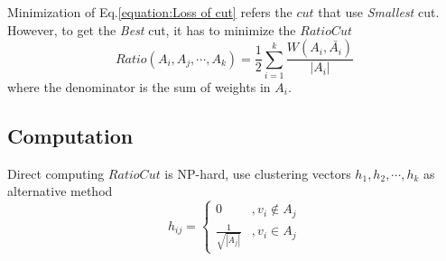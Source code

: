 \documentclass[a4paper]{article}
\begin{document}
Minimization of Eq.\ref{equation:Loss of cut} refers the $cut$ that use \emph{Smallest} cut.
However, to get the \emph{Best} cut, it has to minimize the $RatioCut$
\begin{equation}
    \label{equation:Loss of ratio cut}
    Ratio(A_i, A_j, \cdots, A_k) = \frac{1}{2} \sum_{i=1}^{k} \frac{W(A_i, \bar{A_i})}{|A_i|}
\end{equation}
where the denominator is the sum of weights in $A_i$.

\subsection{Computation}
Direct computing $RatioCut$ is NP-hard, use clustering vectors ${h_1, h_2, \cdots, h_k}$ as alternative method
\begin{equation*}
    h_{ij} =
    \left\{
    \begin{array}{lr}
        0                      & , v_i \notin A_j \\
        \frac{1}{\sqrt{|A_j|}} & , v_i \in A_j
    \end{array}
    \right.
\end{equation*}
\end{document}
